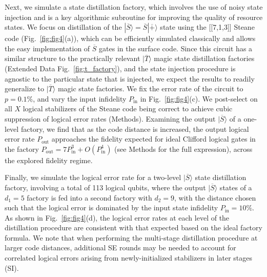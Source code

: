 \documentclass[prl,twocolumn,superscriptaddress,secnumarabic,balancelastpage,amsmath,amssymb]{revtex4-2}
\newcommand{\lket}[1]{|{\overline{#1}}\rangle}
\begin{document}
Next, we simulate a state distillation factory, which involves the use of noisy state injection and is a key algorithmic subroutine for improving the quality of resource states.
%
We focus on distillation of the $\lket{S}=\overline{S}\lket{+}$ state using the [[7,1,3]] Steane code (Fig.~\ref{fig:fig4}(a)),
which can be efficiently simulated classically and allows the easy implementation of $\overline{S}$ gates in the surface code. 
%
Since this circuit has a similar structure to the practically relevant $\lket{T}$ magic state distillation factories (Extended Data Fig.~\ref{fig:t_factory}), and the state injection procedure is agnostic to the particular state that is injected, we expect the results to readily generalize to $\lket{T}$ magic state factories. 
%
We fix the error rate of the circuit to $p=0.1\%$, and vary the input infidelity $P_{\mathrm{in}}$ in Fig.~\ref{fig:fig4}(c).
%
We post-select on all $X$ logical stabilizers of the Steane code being correct to achieve cubic suppression of logical error rates (Methods).
%
Examining the output $\lket{S}$ of a one-level factory, we find that as the code distance is increased, the output logical error rate $P_{\mathrm{out}}$ approaches the fidelity expected for ideal Clifford logical gates in the factory $P_{\mathrm{out}}=7P_{\mathrm{in}}^3+O(P_{\mathrm{in}}^4)$ (see Methods for the full expression), across the explored fidelity regime.

Finally, we simulate the logical error rate for a two-level $\lket{S}$ state distillation factory, involving a total of 113 logical qubits, where the output $\lket{S}$ states of a $d_1=5$ factory is fed into a second factory with $d_2=9$, with the distance chosen such that the logical error is dominated by the input state infidelity $P_{\mathrm{in}}=10\%$.
%
As shown in Fig.~\ref{fig:fig4}(d), the logical error rates at each level of the distillation procedure are consistent with that expected based on the ideal factory formula.
%
We note that when performing the multi-stage distillation procedure at larger code distances, additional SE rounds may be needed to account for correlated logical errors arising from newly-initialized stabilizers in later stages (SI).
\end{document}
